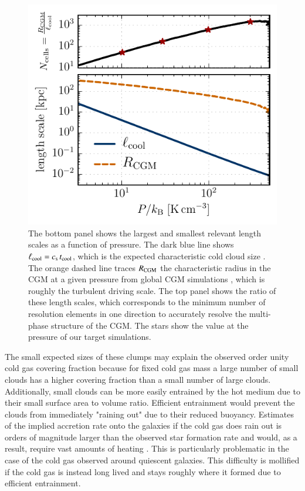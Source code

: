 \documentclass[11pt,letterpaper,english]{article}
\begin{document}
\begin{figure}[t]
    \centering
    \begin{minipage}{0.425\textwidth}
	\caption{ The bottom panel shows the largest and smallest relevant length scales as a function of pressure. The dark blue line shows $\ell_{\rm cool} = c_{\rm s} \, t_{\rm cool}$, which is the expected characteristic cold cloud size \cite{McCourt18}. The orange dashed line traces $R_{\rm CGM}$ the characteristic radius in the CGM at a given pressure from global CGM simulations \cite{Fielding17}, which is roughly the turbulent driving scale. The top panel shows the ratio of these length scales, which corresponds to the minimum number of resolution elements in one direction to accurately resolve the multi-phase structure of the CGM.  The stars show the value at the pressure of our target simulations. \label{fig:cs_tcool}}
    \end{minipage}\hfill
    \begin{minipage}{0.575\textwidth}
        \includegraphics[width=\textwidth]{length_scales_sim.pdf} 
    \end{minipage}
\end{figure}

The small expected sizes of these clumps may explain the observed order unity cold gas covering fraction because for fixed cold gas mass a large number of small clouds has a higher covering fraction than a small number of large clouds. Additionally, small clouds can be more easily entrained by the hot medium due to their small surface area to volume ratio. Efficient entrainment would prevent the clouds from immediately "raining out" due to their reduced buoyancy. Estimates of the implied accretion rate onto the galaxies if the cold gas does rain out is orders of magnitude larger than the observed star formation rate and would, as a result, require vast amounts of heating \cite{McQuinnWerk}. This is particularly problematic in the case of the cold gas observed around quiescent galaxies. This difficulty is mollified if the cold gas is instead long lived and stays roughly where it formed due to efficient entrainment.
\end{document}
